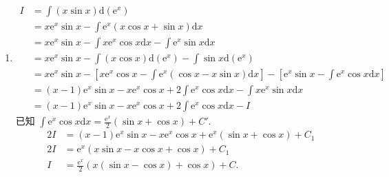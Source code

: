 \begin{solution}
\begin{enumerate}
        \item \begin{align*}
                  I & = \int (x \sin x) \mathrm{d}(\mathrm{e}^x)                                                                                                                                                     \\
                    & = x \mathrm{e}^x \sin x - \int \mathrm{e}^x (x \cos x + \sin x) \mathrm{d}x                                                                                                                    \\
                    & = x \mathrm{e}^x \sin x - \int x \mathrm{e}^x \cos x \mathrm{d}x - \int \mathrm{e}^x \sin x \mathrm{d}x                                                                                        \\
                    & = x \mathrm{e}^x \sin x - \int (x \cos x) \mathrm{d}(\mathrm{e}^x) - \int \sin x \mathrm{d}(\mathrm{e}^x)                                                                                      \\
                    & = x \mathrm{e}^x \sin x - \left[ x \mathrm{e}^x \cos x - \int \mathrm{e}^x (\cos x - x \sin x) \mathrm{d}x \right] - \left[ \mathrm{e}^x \sin x - \int \mathrm{e}^x \cos x \mathrm{d}x \right] \\
                    & = (x-1)\mathrm{e}^x \sin x - x \mathrm{e}^x \cos x + 2 \int \mathrm{e}^x \cos x \mathrm{d}x - \int x \mathrm{e}^x \sin x \mathrm{d}x                                                           \\
                  & = (x-1)\mathrm{e}^x \sin x - x \mathrm{e}^x \cos x + 2 \int \mathrm{e}^x \cos x \mathrm{d}x - I
              \end{align*}
              已知 $\int \mathrm{e}^x \cos x \mathrm{d}x = \frac{\mathrm{e}^x}{2}(\sin x + \cos x) + C'$.
              \begin{align*}
                  2I & = (x-1)\mathrm{e}^x \sin x - x \mathrm{e}^x \cos x + \mathrm{e}^x(\sin x + \cos x) + C_1 \\
                  2I & = \mathrm{e}^x (x \sin x - x \cos x + \cos x) + C_1                                      \\
                  I  & = \frac{\mathrm{e}^x}{2} (x (\sin x - \cos x) + \cos x) + C.
              \end{align*}


\end{enumerate}
\end{solution}

